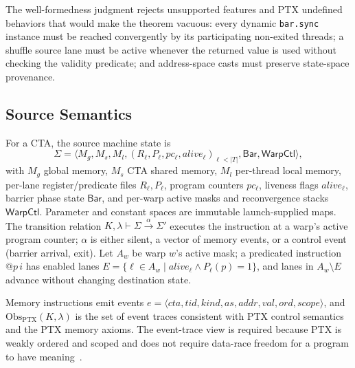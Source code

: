 \documentclass[sigplan,nonacm]{acmart}
\begin{document}
The well-formedness judgment rejects unsupported features and PTX undefined
behaviors that would make the theorem vacuous: every dynamic
\texttt{bar.sync} instance must be reached convergently by its participating
non-exited threads; a shuffle source lane must be active whenever the
returned value is used without checking the validity predicate; and
address-space casts must preserve state-space provenance.

\subsection{Source Semantics}
\label{sec:source-sem}

For a CTA, the source machine state is
\[
  \Sigma =
  \langle
    M_g, M_s,
    M_l,
    (R_\ell,P_\ell,pc_\ell,alive_\ell)_{\ell<|T|},
    \mathsf{Bar},
    \mathsf{WarpCtl}
  \rangle ,
\]
with $M_g$ global memory, $M_s$ CTA shared memory, $M_l$ per-thread local
memory, per-lane register/predicate files $R_\ell, P_\ell$, program counters
$pc_\ell$, liveness flags $alive_\ell$, barrier phase state $\mathsf{Bar}$,
and per-warp active masks and reconvergence stacks $\mathsf{WarpCtl}$.
Parameter and constant spaces are immutable launch-supplied maps.  The
transition relation
$K,\lambda \vdash \Sigma \xrightarrow{\alpha} \Sigma'$
executes the instruction at a warp's active program counter; $\alpha$ is
either silent, a vector of memory events, or a control event (barrier
arrival, exit).  Let $A_w$ be warp $w$'s active mask; a predicated
instruction $@p\,i$ has enabled lanes
$E = \{\ell \in A_w \mid alive_\ell \wedge P_\ell(p)=1\}$, and lanes in
$A_w \setminus E$ advance without changing destination state.

Memory instructions emit events
$e = \langle \mathit{cta}, \mathit{tid}, \mathit{kind}, \mathit{as},
\mathit{addr}, \mathit{val}, \mathit{ord}, \mathit{scope} \rangle$, and
$\mathrm{Obs}_{\mathrm{PTX}}(K,\lambda)$ is the set of event traces
consistent with PTX control semantics and the PTX memory axioms.  The
event-trace view is required because PTX is weakly ordered and scoped and
does not require data-race freedom for a program to have
meaning~\cite{lustig2019ptxmemory}.
\end{document}
